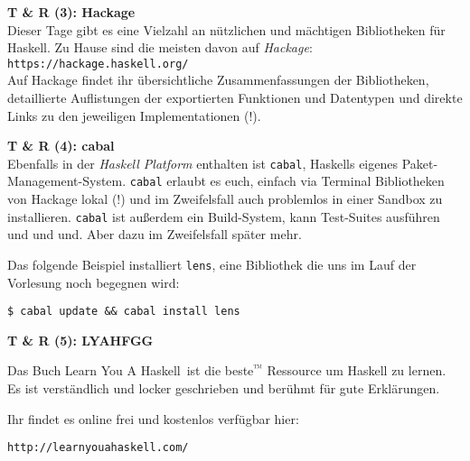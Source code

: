 \documentclass{beamer}
\begin{document}
  
  \begin{frame}
    \begin{center}
    \Large\textbf{T \& R (3): Hackage}\\ \bigskip \normalsize
    Dieser Tage gibt es eine Vielzahl an nützlichen und mächtigen Bibliotheken für Haskell. Zu Hause sind die meisten davon auf \emph{Hackage}: \\ \bigskip \texttt{https://hackage.haskell.org/} \\ \bigskip
    Auf Hackage findet ihr übersichtliche Zusammenfassungen der Bibliotheken, detaillierte Auflistungen der exportierten Funktionen und Datentypen und direkte Links zu den jeweiligen Implementationen (!).
    \end{center}
  \end{frame}
  
  
  \begin{frame}
    \begin{center}
    \Large\textbf{T \& R (4): cabal}\\ \bigskip \normalsize
    Ebenfalls in der \emph{Haskell Platform} enthalten ist \texttt{cabal}, Haskells eigenes Paket-Management-System. \texttt{cabal} erlaubt es euch, einfach via Terminal Bibliotheken von Hackage lokal (!) und im Zweifelsfall auch problemlos in einer Sandbox zu installieren. \texttt{cabal} ist außerdem ein Build-System, kann Test-Suites ausführen und und und. Aber dazu im Zweifelsfall später mehr.\bigskip
    
    Das folgende Beispiel installiert \texttt{lens}, eine Bibliothek die uns im Lauf der Vorlesung noch begegnen wird:\bigskip
   
    \texttt{\$ cabal update \&\& cabal install lens}
    
    
    \end{center}
  \end{frame}
  
  
  \begin{frame}
    \begin{center}
    \Large\textbf{T \& R (5): LYAHFGG}\\ \bigskip \normalsize
    \begin{multicols}{2}
    
	
	\columnbreak    
    Das Buch \glqq Learn You A Haskell\grqq\ ist die beste$^{™}$ Ressource um Haskell zu lernen. Es ist verständlich und locker geschrieben und berühmt für gute Erklärungen.\bigskip
   
    Ihr findet es online frei und kostenlos verfügbar hier:
    
    \texttt{http://learnyouahaskell.com/}
    \end{multicols}
    \end{center}
  \end{frame}
  
\end{document}

